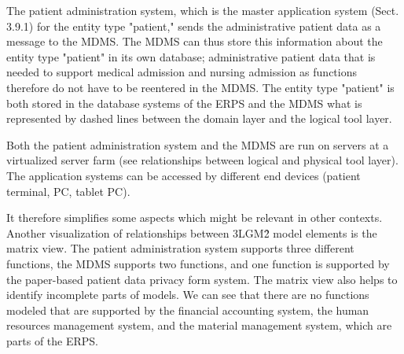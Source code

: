 The patient administration system, which is the master application system (Sect. 3.9.1) for the entity type "patient," sends the administrative patient data as a message to the MDMS.
The MDMS can thus store this information about the entity type "patient" in its own database; administrative patient data that is needed to support medical admission and nursing admission as functions therefore do not have to be reentered in the MDMS.
The entity type "patient" is both stored in the database systems of the ERPS and the MDMS what is represented by dashed lines between the domain layer and the logical tool layer.

Both the patient administration system and the MDMS are run on servers at a virtualized server farm (see relationships between logical and physical tool layer). The application systems can be accessed by different end devices (patient terminal, PC, tablet PC).

It therefore simplifies some aspects which might be relevant in other contexts.
Another visualization of relationships between 3LGM\^2 model elements is the matrix view.
The patient administration system supports three different functions, the MDMS supports two functions, and one function is supported by the paper-based patient data privacy form system.
The matrix view also helps to identify incomplete parts of models.
We can see that there are no functions modeled that are supported by the financial accounting system, the human resources management system, and the material management system, which are parts of the ERPS.

